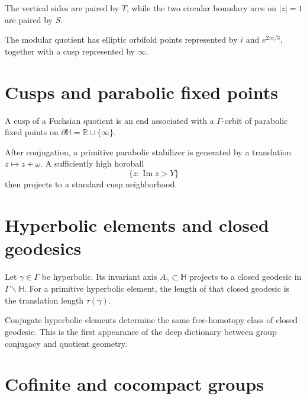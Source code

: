 \begin{proposition}\label{prop:vii35-modular-sides}
The vertical sides are paired by \(T\), while the two circular boundary arcs on \(|z|=1\) are paired by \(S\).
\end{proposition}

\begin{remark}\label{rem:vii35-modular-orbifold}
The modular quotient has elliptic orbifold points represented by \(i\) and \(e^{2\pi i/3}\), together with a cusp represented by \(\infty\).
\end{remark}


\section{Cusps and parabolic fixed points}

\begin{definition}[Cusp]\label{def:vii35-cusp}
A cusp of a Fuchsian quotient is an end associated with a \(\Gamma\)-orbit of parabolic fixed points on \(\partial\mathbb H=\mathbb R\cup\{\infty\}\).
\end{definition}

After conjugation, a primitive parabolic stabilizer is generated by a translation \(z\mapsto z+\omega\).  A sufficiently high horoball
\[
\{z:\operatorname{Im}z>Y\}
\]
then projects to a standard cusp neighborhood.


\section{Hyperbolic elements and closed geodesics}

\begin{theorem}\label{thm:vii35-axis-closed}
Let \(\gamma\in\Gamma\) be hyperbolic.  Its invariant axis \(A_\gamma\subset\mathbb H\) projects to a closed geodesic in \(\Gamma\backslash\mathbb H\).  For a primitive hyperbolic element, the length of that closed geodesic is the translation length \(\tau(\gamma)\).
\end{theorem}

Conjugate hyperbolic elements determine the same free-homotopy class of closed geodesic.  This is the first appearance of the deep dictionary between group conjugacy and quotient geometry.


\section{Cofinite and cocompact groups}

